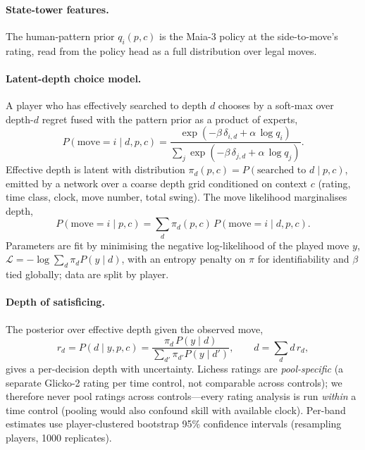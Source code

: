 \documentclass[11pt]{article}
\begin{document}
\paragraph{State-tower features.} The human-pattern prior $q_i(p,c)$ is the Maia-3 policy at
the side-to-move's rating, read from the policy head as a full distribution over legal moves.

\paragraph{Latent-depth choice model.} A player who has effectively searched to depth $d$
chooses by a soft-max over depth-$d$ regret fused with the pattern prior as a product of
experts,
\begin{equation}
P(\text{move}{=}i \mid d,p,c)=
\frac{\exp(-\beta\,\delta_{i,d}+\alpha\,\log q_i)}
     {\sum_j \exp(-\beta\,\delta_{j,d}+\alpha\,\log q_j)} .
\end{equation}
Effective depth is latent with distribution $\pi_d(p,c)=P(\text{searched to }d\mid p,c)$,
emitted by a network over a coarse depth grid conditioned on context $c$ (rating, time class,
clock, move number, total swing). The move likelihood marginalises depth,
\begin{equation}
P(\text{move}{=}i\mid p,c)=\sum_d \pi_d(p,c)\,P(\text{move}{=}i\mid d,p,c).
\end{equation}
Parameters are fit by minimising the negative log-likelihood of the played move $y$,
$\mathcal{L}=-\log\sum_d \pi_d P(y\mid d)$, with an entropy penalty on $\pi$ for
identifiability and $\beta$ tied globally; data are split by player.

\paragraph{Depth of satisficing.} The posterior over effective depth given the observed move,
\begin{equation}
r_d=P(d\mid y,p,c)=\frac{\pi_d\,P(y\mid d)}{\sum_{d'}\pi_{d'}P(y\mid d')},
\qquad \hat d=\sum_d d\,r_d ,
\end{equation}
gives a per-decision depth with uncertainty. Lichess ratings are \emph{pool-specific} (a
separate Glicko-2 rating per time control, not comparable across controls); we therefore
never pool ratings across controls---every rating analysis is run \emph{within} a time control
(pooling would also confound skill with available clock). Per-band estimates use
player-clustered bootstrap \citep{efron1979} 95\% confidence intervals (resampling players, 1000
replicates).
\end{document}
